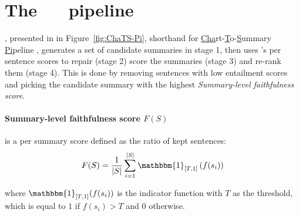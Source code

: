 \section{The \pipeline{}~\piemoji{}~ pipeline}
\pipeline{} \piemoji, presented in in Figure~\ref{fig:ChaTS-Pi}, shorthand for \underline{Cha}rt-\underline{T}o-\underline{S}ummary \underline{Pi}peline , generates a set of candidate summaries in stage 1, then uses \metric{}'s per sentence scores to repair (stage 2) score the summaries (stage 3) and re-rank them (stage 4).
This is done by removing sentences with low entailment scores and picking the candidate summary with the highest \emph{Summary-level faithfulness score}.%

\paragraph{Summary-level faithfulness score $F(S)$} is a per summary score defined as the ratio of kept sentences:
  \vspace{-3ex}
\[
F(S) = \frac{1}{|S|}\sum_{i=1}^{|S|} \mathbbm{1}_{[T, 1]}\left( f(s_i) \right) %
\vspace{-1ex}
\]
 
where $\mathbbm{1}_{[T, 1]}(f(s_i))$ is the indicator function with $T$ as the threshold, which is equal to $1$ if $f(s_i) > T$ and 0 otherwise.
